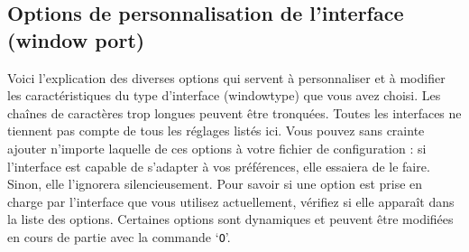 \documentclass[titlepage]{article}
\begin{document}
\subsection*{Options de personnalisation de l'interface (window port)}

Voici l'explication des diverses options qui servent
à personnaliser et à modifier les caractéristiques du
type d'interface (windowtype) que vous avez choisi.
Les chaînes de caractères trop longues peuvent être tronquées.
Toutes les interfaces ne tiennent pas compte de tous les réglages
listés ici.  Vous pouvez sans crainte ajouter n'importe laquelle de ces
options à votre fichier de configuration : si l'interface est capable de
s'adapter à vos préférences, elle essaiera de le faire. Sinon,
elle l'ignorera silencieusement.  Pour savoir si une
option est prise en charge par l'interface que vous utilisez
actuellement, vérifiez si elle apparaît dans la liste des options.
Certaines options sont dynamiques et peuvent être modifiées en cours
de partie avec la commande `\texttt{O}'.
\end{document}
